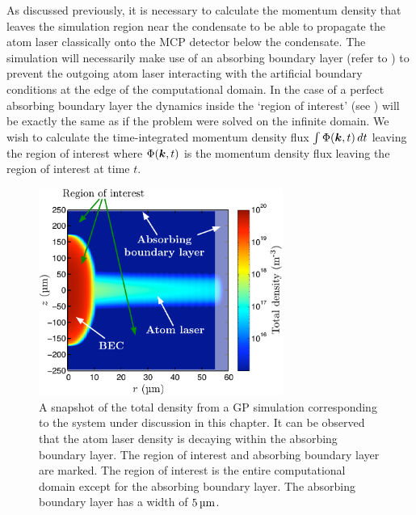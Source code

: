 As discussed previously, it is necessary to calculate the momentum density that leaves the simulation region near the condensate to be able to propagate the atom laser classically onto the MCP detector below the condensate. The simulation will necessarily make use of an absorbing boundary layer (refer to ) to prevent the outgoing atom laser interacting with the artificial boundary conditions at the edge of the computational domain.  In the case of a perfect absorbing boundary layer the dynamics inside the `region of interest' (see ) will be exactly the same as if the problem were solved on the infinite domain. We wish to calculate the time-integrated momentum density flux $\int \Phi(\bm{k}, t) \, dt$ leaving the region of interest where $\Phi(\bm{k}, t)$ is the momentum density flux leaving the region of interest at time $t$.

\begin{figure}
    \centering
    \includegraphics[width=8cm]{RegionOfInterest}
    \caption{A snapshot of the total density from a GP simulation corresponding to the system under discussion in this chapter. It can be observed that the atom laser density is decaying within the absorbing boundary layer. The region of interest and absorbing boundary layer are marked. The region of interest is the entire computational domain except for the absorbing boundary layer. The absorbing boundary layer has a width of $\unit[5]{\micro m}$. \label{Peaks:RegionOfInterest}}
\end{figure}

